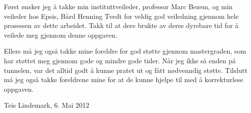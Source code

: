 Først ønsker jeg å takke min instituttveileder, professor Marc Bezem, og min veileder hos Epsis, Bård Henning Tvedt for veldig god veiledning gjennom hele prosessen av dette arbeidet. Takk til at dere brukte av deres dyrebare tid for å veilede meg gjennom denne oppgaven.

Ellers må jeg også takke mine foreldre for god støtte gjennom mastergraden, som har støttet meg gjennom gode og mindre gode tider. Når jeg ikke så enden på tunnelen, var det alltid godt å kunne pratet ut og fått nødvenndig støtte. Tilslutt må jeg også takke foreldrene mine for at de kunne hjelpe til med å korrekturlese oppgaven.

Teis Lindemark, 6. Mai 2012